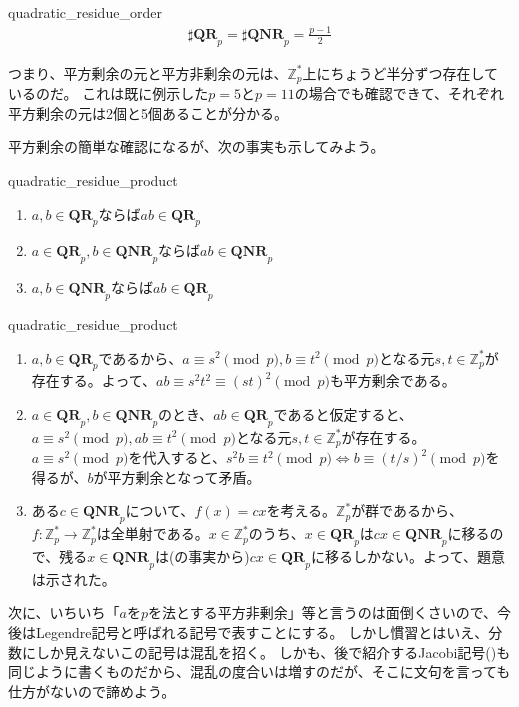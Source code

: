 \begin{Prop}{}{quadratic_residue_order}
\begin{align*}
\sharp\mathbf{QR}_p = \sharp\mathbf{QNR}_p = \frac{p-1}{2}
\end{align*}
\end{Prop}

つまり、平方剰余の元と平方非剰余の元は、$\mathbb{Z}_p^*$上にちょうど半分ずつ存在しているのだ。
これは既に例示した$p=5$と$p=11$の場合でも確認できて、それぞれ平方剰余の元は2個と5個あることが分かる。

平方剰余の簡単な確認になるが、次の事実も示してみよう。

\begin{Prop}{}{quadratic_residue_product}\;
\begin{enumerate}
 \item $a,b\in\mathbf{QR}_p$ならば$ab\in\mathbf{QR}_p$
 \item $a\in\mathbf{QR}_p, b\in\mathbf{QNR}_p$ならば$ab\in\mathbf{QNR}_p$
 \item $a,b\in\mathbf{QNR}_p$ならば$ab\in\mathbf{QR}_p$
\end{enumerate}
\end{Prop}

\begin{prProof}{quadratic_residue_product}\;
\begin{enumerate}
 \item $a,b\in\mathbf{QR}_p$であるから、$a\equiv s^2\pmod{p}, b\equiv t^2\pmod{p}$となる元$s,t\in\mathbb{Z}_p^*$が存在する。よって、$ab\equiv s^2t^2\equiv(st)^2\pmod{p}$も平方剰余である。
 \item $a\in\mathbf{QR}_p, b\in\mathbf{QNR}_p$のとき、$ab\in\mathbf{QR}_p$であると仮定すると、$a\equiv s^2\pmod{p}, ab\equiv t^2\pmod{p}$となる元$s,t\in\mathbb{Z}_p^*$が存在する。$a\equiv s^2\pmod{p}$を代入すると、$s^2b\equiv t^2\pmod{p}\iff b\equiv (t/s)^2\pmod{p}$を得るが、$b$が平方剰余となって矛盾。
 \item ある$c \in \mathbf{QNR}_p$について、$f(x)=cx$を考える。$\mathbb{Z}_p^*$が群であるから、$f:\mathbb{Z}_p^*\to\mathbb{Z}_p^*$は全単射である。$x \in \mathbb{Z}_p^*$のうち、$x\in\mathbf{QR}_p$は$cx\in\mathbf{QNR}_p$に移るので、残る$x\in\mathbf{QNR}_p$は(の事実から)$cx\in\mathbf{QR}_p$に移るしかない。よって、題意は示された。
\end{enumerate}
\end{prProof}

次に、いちいち「$a$を$p$を法とする平方非剰余」等と言うのは面倒くさいので、今後はLegendre記号と呼ばれる記号で表すことにする。
しかし慣習とはいえ、分数にしか見えないこの記号は混乱を招く。
しかも、後で紹介するJacobi記号()も同じように書くものだから、混乱の度合いは増すのだが、そこに文句を言っても仕方がないので諦めよう。


